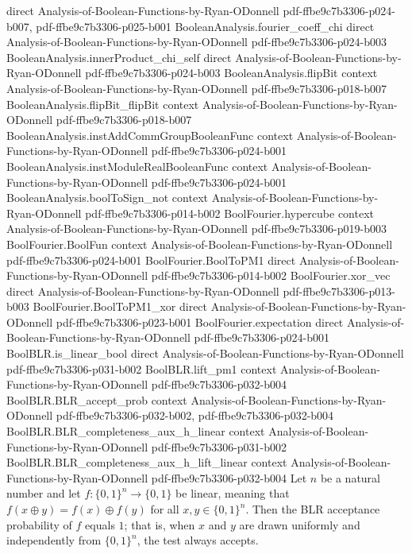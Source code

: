 \begin{lemma}
  {direct}
  {Analysis-of-Boolean-Functions-by-Ryan-ODonnell}
  {pdf-ffbe9c7b3306-p024-b007,
    pdf-ffbe9c7b3306-p025-b001}
\proofstep
  {BooleanAnalysis.fourier_coeff_chi}
  {direct}
  {Analysis-of-Boolean-Functions-by-Ryan-ODonnell}
  {pdf-ffbe9c7b3306-p024-b003}
\proofstep
  {BooleanAnalysis.innerProduct_chi_self}
  {direct}
  {Analysis-of-Boolean-Functions-by-Ryan-ODonnell}
  {pdf-ffbe9c7b3306-p024-b003}
\proofstep
  {BooleanAnalysis.flipBit}
  {context}
  {Analysis-of-Boolean-Functions-by-Ryan-ODonnell}
  {pdf-ffbe9c7b3306-p018-b007}
\proofstep
  {BooleanAnalysis.flipBit_flipBit}
  {context}
  {Analysis-of-Boolean-Functions-by-Ryan-ODonnell}
  {pdf-ffbe9c7b3306-p018-b007}
\proofstep
  {BooleanAnalysis.instAddCommGroupBooleanFunc}
  {context}
  {Analysis-of-Boolean-Functions-by-Ryan-ODonnell}
  {pdf-ffbe9c7b3306-p024-b001}
\proofstep
  {BooleanAnalysis.instModuleRealBooleanFunc}
  {context}
  {Analysis-of-Boolean-Functions-by-Ryan-ODonnell}
  {pdf-ffbe9c7b3306-p024-b001}
\proofstep
  {BooleanAnalysis.boolToSign_not}
  {context}
  {Analysis-of-Boolean-Functions-by-Ryan-ODonnell}
  {pdf-ffbe9c7b3306-p014-b002}
\proofstep
  {BoolFourier.hypercube}
  {context}
  {Analysis-of-Boolean-Functions-by-Ryan-ODonnell}
  {pdf-ffbe9c7b3306-p019-b003}
\proofstep
  {BoolFourier.BoolFun}
  {context}
  {Analysis-of-Boolean-Functions-by-Ryan-ODonnell}
  {pdf-ffbe9c7b3306-p024-b001}
\proofstep
  {BoolFourier.BoolToPM1}
  {direct}
  {Analysis-of-Boolean-Functions-by-Ryan-ODonnell}
  {pdf-ffbe9c7b3306-p014-b002}
\proofstep
  {BoolFourier.xor_vec}
  {direct}
  {Analysis-of-Boolean-Functions-by-Ryan-ODonnell}
  {pdf-ffbe9c7b3306-p013-b003}
\proofstep
  {BoolFourier.BoolToPM1_xor}
  {direct}
  {Analysis-of-Boolean-Functions-by-Ryan-ODonnell}
  {pdf-ffbe9c7b3306-p023-b001}
\proofstep
  {BoolFourier.expectation}
  {direct}
  {Analysis-of-Boolean-Functions-by-Ryan-ODonnell}
  {pdf-ffbe9c7b3306-p024-b001}
\proofstep
  {BoolBLR.is_linear_bool}
  {direct}
  {Analysis-of-Boolean-Functions-by-Ryan-ODonnell}
  {pdf-ffbe9c7b3306-p031-b002}
\proofstep
  {BoolBLR.lift_pm1}
  {context}
  {Analysis-of-Boolean-Functions-by-Ryan-ODonnell}
  {pdf-ffbe9c7b3306-p032-b004}
\proofstep
  {BoolBLR.BLR_accept_prob}
  {context}
  {Analysis-of-Boolean-Functions-by-Ryan-ODonnell}
  {pdf-ffbe9c7b3306-p032-b002,
    pdf-ffbe9c7b3306-p032-b004}
\proofstep
  {BoolBLR.BLR_completeness_aux_h_linear}
  {context}
  {Analysis-of-Boolean-Functions-by-Ryan-ODonnell}
  {pdf-ffbe9c7b3306-p031-b002}
\proofstep
  {BoolBLR.BLR_completeness_aux_h_lift_linear}
  {context}
  {Analysis-of-Boolean-Functions-by-Ryan-ODonnell}
  {pdf-ffbe9c7b3306-p032-b004}
Let $n$ be a natural number and let $f : \{0,1\}^n \to \{0,1\}$ be linear, meaning that
$f(x \oplus y) = f(x) \oplus f(y)$ for all $x, y \in \{0,1\}^n$. Then the BLR acceptance
probability of $f$ equals $1$; that is, when $x$ and $y$ are drawn uniformly and
independently from $\{0,1\}^n$, the test always accepts.
\end{lemma}

